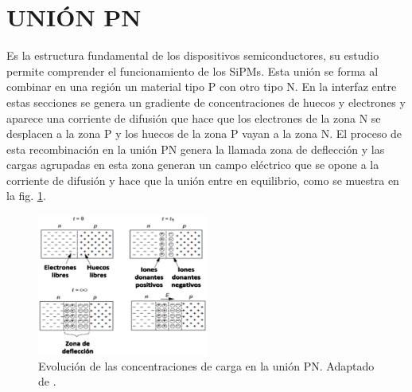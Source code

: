 \section{UNIÓN PN}
Es la estructura fundamental de los dispositivos semiconductores, su estudio permite comprender el funcionamiento de los SiPMs. Esta unión se forma al combinar en una región un material tipo P con otro tipo N. En la interfaz entre estas secciones se genera un gradiente de concentraciones de huecos y electrones y aparece una corriente de difusión que hace que los electrones de la zona N se desplacen a la zona P y los huecos de la zona P vayan a la zona N. El proceso de esta recombinación en la unión PN genera la llamada zona de deflección y las cargas agrupadas en esta zona generan un campo eléctrico que se opone a la corriente de difusión y hace que la unión entre en equilibrio, como se muestra en la fig. \ref{fig:PNjuntion}.
\begin{figure}[h!]
\begin{centering}
  \includegraphics[width=0.5\textwidth]{Images/UnionPN.eps}
  \caption{Evolución de las concentraciones de carga en la unión PN. Adaptado de \citep{Book_razavi}.}
  \label{fig:PNjuntion}
  \par\end{centering}
\end{figure}

